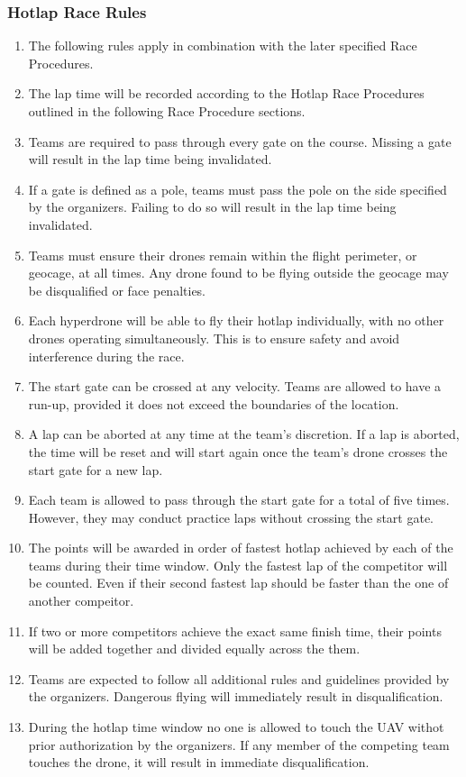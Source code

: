     \subsubsection{Hotlap Race Rules}
    \begin{enumerate}
      \item The following rules apply in combination with the later specified Race Procedures.
      \item The lap time will be recorded according to the Hotlap Race Procedures outlined in the following Race Procedure sections.
      \item Teams are required to pass through every gate on the course. Missing a gate will result in the lap time being invalidated.
      \item If a gate is defined as a pole, teams must pass the pole on the side specified by the organizers. Failing to do so will result in the lap time being invalidated.
      \item Teams must ensure their drones remain within the flight perimeter, or geocage, at all times. Any drone found to be flying outside the geocage may be disqualified or face penalties.
      \item Each hyperdrone will be able to fly their hotlap individually, with no other drones operating simultaneously. This is to ensure safety and avoid interference during the race.
      \item The start gate can be crossed at any velocity. Teams are allowed to have a run-up, provided it does not exceed the boundaries of the location.
      \item A lap can be aborted at any time at the team's discretion. If a lap is aborted, the time will be reset and will start again once the team's drone crosses the start gate for a new lap.
      \item Each team is allowed to pass through the start gate for a total of five times. However, they may conduct practice laps without crossing the start gate.  
      \item The points will be awarded in order of fastest hotlap achieved by each of the teams during their time window. Only the fastest lap of the competitor will be counted. Even if their second fastest lap should be faster than the one of another compeitor.
      \item If two or more competitors achieve the exact same finish time, their points will be added together and divided equally across the them.  
      \item Teams are expected to follow all additional rules and guidelines provided by the organizers. Dangerous flying will immediately result in disqualification. 
      \item During the hotlap time window no one is allowed to touch the UAV withot prior authorization by the organizers. If any member of the competing team touches the drone, it will result in immediate disqualification.
    \end{enumerate}


